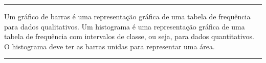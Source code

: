 \documentclass[a4paper,11pt,fleqn]{article}\usepackage[]{graphicx}\usepackage[]{color}
\theoremstyle{definition}
\begin{document}
\vspace{0.3cm}
\hrule
\vspace{0.3cm}

\begin{compactenum}[8.]
\item Um gráfico de barras é uma representação gráfica de uma tabela de
  frequência para dados qualitativos. Um histograma é uma representação
  gráfica de uma tabela de frequência com intervalos de classe, ou seja,
  para dados quantitativos. O histograma deve ter as barras unidas para
  representar uma área.
\end{compactenum}

\vspace{0.3cm}
\hrule
\vspace{0.3cm}
\end{document}
